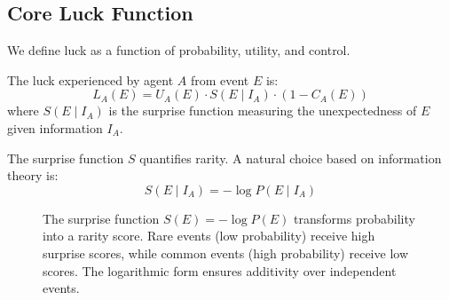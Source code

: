   \subsection{Core Luck Function}

  We define luck as a function of probability, utility, and control.

  \begin{definition}[Luck]
    \label{def:luck} The luck experienced by agent $A$ from event $E$ is:
    \begin{equation}
      L_{A}(E) = U_{A}(E) \cdot S(E \mid I_{A}) \cdot (1 - C_{A}(E))
    \end{equation}
    where $S(E \mid I_{A})$ is the surprise function measuring the
    unexpectedness of $E$ given information $I_{A}$.
  \end{definition}

  The surprise function $S$ quantifies rarity. A natural choice based on
  information theory is:
  \begin{equation}
    S(E \mid I_{A}) = -\log P(E \mid I_{A})
  \end{equation}

  \begin{figure}[h]
    \centering
    \caption{The surprise function $S(E) = -\log P(E)$ transforms probability into a rarity score. Rare events (low probability) receive high surprise scores, while common events (high probability) receive low scores. The logarithmic form ensures additivity over independent events.}
    \label{fig:surprise}
  \end{figure}

